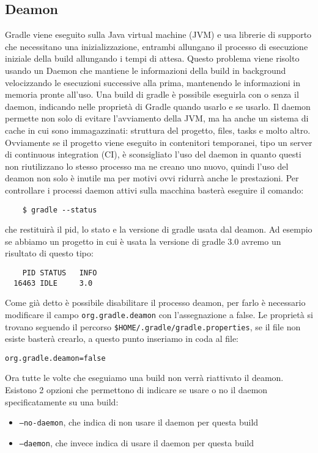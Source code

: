 \subsection{Deamon}
Gradle viene eseguito sulla Java virtual machine (JVM) e usa librerie di supporto che necessitano una inizializzazione, entrambi allungano il processo di esecuzione iniziale della build allungando i tempi di attesa. Questo problema viene risolto usando un Daemon che mantiene le informazioni della build in background velocizzando le esecuzioni successive alla prima, mantenendo le informazioni in memoria pronte all'uso. Una build di gradle è possibile eseguirla con o senza il daemon, indicando nelle proprietà di Gradle quando usarlo e se usarlo. Il daemon permette non solo di evitare l'avviamento della JVM, ma ha anche un sistema di cache in cui sono immagazzinati: struttura del progetto, files, tasks e molto altro. Ovviamente se il progetto viene eseguito in contenitori temporanei, tipo un server di continuous integration (CI), è sconsigliato l'uso del daemon in quanto questi non riutilizzano lo stesso processo ma ne creano uno nuovo, quindi l'uso del deamon non solo è inutile ma per motivi ovvi ridurrà anche le prestazioni. Per controllare i processi daemon attivi sulla macchina basterà eseguire il comando:
\begin{verbatim}
    $ gradle --status \end{verbatim}
che restituirà il pid, lo stato e la versione di gradle usata dal deamon. Ad esempio se abbiamo un progetto in cui è usata la versione di gradle 3.0 avremo un risultato di questo tipo:
\begin{verbatim}
    PID STATUS   INFO
  16463 IDLE     3.0 \end{verbatim}
Come già detto è possibile disabilitare il processo deamon, per farlo è necessario modificare il campo \texttt{org.gradle.deamon} con l'assegnazione a false. Le proprietà si trovano seguendo il percorso \texttt{\$HOME/.gradle/gradle.properties}, se il file non esiste basterà crearlo, a questo punto inseriamo in coda al file:
\begin{lstlisting}[frame=single]
    org.gradle.deamon=false
\end{lstlisting}
Ora tutte le volte che eseguiamo una build non verrà riattivato il deamon. Esistono 2 opzioni che permettono di indicare se usare o no il daemon specificatamente su una build:
\begin{itemize}
    \item \texttt{--no-daemon}, che indica di non usare il daemon per questa build
    \item \texttt{--daemon}, che invece indica di usare il daemon per questa build
\end{itemize}
